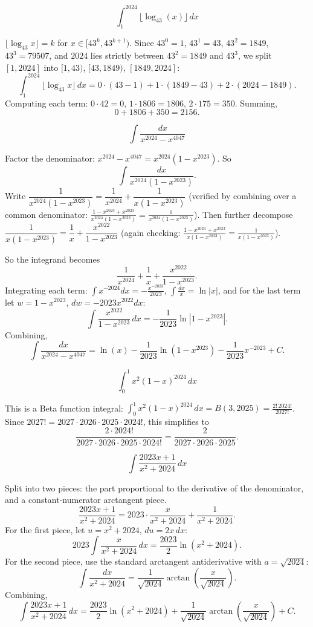 \begin{questions}

\question
\[ \int_1^{2024} \lfloor \log_{43}(x)\rfloor \, dx \]
\begin{solution}
$\lfloor \log_{43}x\rfloor = k$ for $x\in[43^k,43^{k+1})$. Since $43^0=1$, $43^1=43$, $43^2=1849$, $43^3=79507$, and $2024$ lies strictly between $43^2=1849$ and $43^3$, we split $[1,2024]$ into $[1,43)$, $[43,1849)$, $[1849,2024]$:
\[ \int_1^{2024}\lfloor\log_{43}x\rfloor\,dx = 0\cdot(43-1) + 1\cdot(1849-43) + 2\cdot(2024-1849). \]
Computing each term: $0\cdot 42 = 0$, $1\cdot 1806 = 1806$, $2\cdot 175 = 350$. Summing,
\[ 0+1806+350 = 2156. \]
\end{solution}

\question
\[ \int \frac{dx}{x^{2024}-x^{4047}} \]
\begin{solution}
Factor the denominator: $x^{2024}-x^{4047} = x^{2024}(1-x^{2023})$. So
\[ \int \frac{dx}{x^{2024}(1-x^{2023})}. \]
Write $\dfrac{1}{x^{2024}(1-x^{2023})} = \dfrac{1}{x^{2024}} + \dfrac{1}{x(1-x^{2023})}$ (verified by combining over a common denominator: $\frac{1-x^{2023}+x^{2023}}{x^{2024}(1-x^{2023})}=\frac{1}{x^{2024}(1-x^{2023})}$). Then further decompose $\dfrac{1}{x(1-x^{2023})} = \dfrac1x + \dfrac{x^{2022}}{1-x^{2023}}$ (again checking: $\frac{1-x^{2023}+x^{2023}}{x(1-x^{2023})}=\frac1{x(1-x^{2023})}$).

So the integrand becomes
\[ \frac{1}{x^{2024}} + \frac1x + \frac{x^{2022}}{1-x^{2023}}. \]
Integrating each term: $\displaystyle\int x^{-2024}dx = -\frac{x^{-2023}}{2023}$, $\displaystyle\int \frac{dx}{x} = \ln|x|$, and for the last term let $w=1-x^{2023}$, $dw=-2023x^{2022}dx$:
\[ \int \frac{x^{2022}}{1-x^{2023}}\,dx = -\frac{1}{2023}\ln|1-x^{2023}|. \]
Combining,
\[ \int \frac{dx}{x^{2024}-x^{4047}} = \ln(x) - \frac{1}{2023}\ln(1-x^{2023}) - \frac{1}{2023}x^{-2023} + C. \]
\end{solution}

\question
\[ \int_0^1 x^2(1-x)^{2024}\,dx \]
\begin{solution}
This is a Beta function integral: $\displaystyle\int_0^1 x^{2}(1-x)^{2024}\,dx = B(3,2025) = \frac{2!\,2024!}{2027!}$.
Since $2027! = 2027\cdot2026\cdot2025\cdot2024!$, this simplifies to
\[ \frac{2\cdot 2024!}{2027\cdot2026\cdot2025\cdot2024!} = \frac{2}{2027\cdot2026\cdot2025}. \]
\end{solution}

\question
\[ \int \frac{2023x+1}{x^2+2024}\,dx \]
\begin{solution}
Split into two pieces: the part proportional to the derivative of the denominator, and a constant-numerator arctangent piece.
\[ \frac{2023x+1}{x^2+2024} = 2023\cdot\frac{x}{x^2+2024} + \frac{1}{x^2+2024}. \]
For the first piece, let $u=x^2+2024$, $du=2x\,dx$:
\[ 2023\int\frac{x}{x^2+2024}\,dx = \frac{2023}{2}\ln(x^2+2024). \]
For the second piece, use the standard arctangent antiderivative with $a=\sqrt{2024}$:
\[ \int \frac{dx}{x^2+2024} = \frac{1}{\sqrt{2024}}\arctan\!\left(\frac{x}{\sqrt{2024}}\right). \]
Combining,
\[ \int \frac{2023x+1}{x^2+2024}\,dx = \frac{2023}{2}\ln(x^2+2024) + \frac{1}{\sqrt{2024}}\arctan\!\left(\frac{x}{\sqrt{2024}}\right) + C. \]
\end{solution}


\end{questions}
